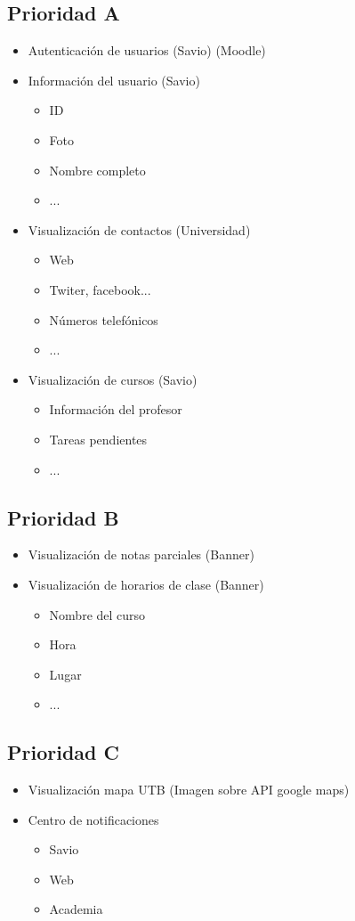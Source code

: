 \subsection{Prioridad A}
\begin{itemize}
 \item Autenticación de usuarios (Savio) (Moodle)
 \item Información del usuario (Savio)
    \begin{itemize}
         \item ID
         \item Foto
         \item Nombre completo
         \item ...
    \end{itemize}
 \item Visualización de contactos (Universidad)
  \begin{itemize}
         \item Web
         \item Twiter, facebook...
         \item Números telefónicos
         \item ...
    \end{itemize}
 \item Visualización de cursos (Savio)
   \begin{itemize}
         \item Información del profesor
         \item Tareas pendientes
         \item ...
    \end{itemize}
\end{itemize}


\subsection{Prioridad B}
\begin{itemize}
 \item Visualización de notas parciales (Banner)
 \item Visualización de horarios de clase (Banner)
 \begin{itemize}
        \item Nombre del curso
        \item Hora
        \item Lugar
         \item ...
    \end{itemize}
\end{itemize}

\subsection{Prioridad C}
\begin{itemize}
 \item Visualización mapa UTB (Imagen sobre API google maps)
 \item Centro de notificaciones
     \begin{itemize}
         \item Savio
         \item Web
         \item Academia
    \end{itemize}
\end{itemize}